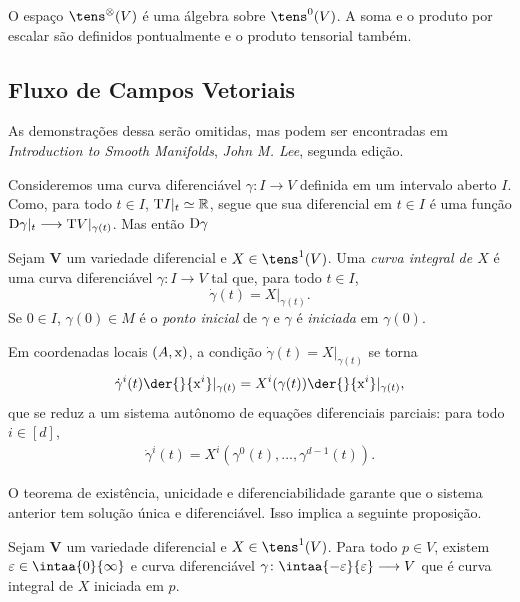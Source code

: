 O espaço $\tens^\otimes (V)$ é uma álgebra sobre $\tens^0(V)$. A soma e o produto por escalar são definidos pontualmente e o produto tensorial também.





\subsection{Fluxo de Campos Vetoriais}

As demonstrações dessa serão omitidas, mas podem ser encontradas em \textit{Introduction to Smooth Manifolds}, \textit{John M. Lee}, segunda edição.

Consideremos uma curva diferenciável $\gamma\colon I \to V$ definida em um intervalo aberto $I$. Como, para todo $t \in I$, $\mathrm{T} I|_t \simeq \mathbb{R}$, segue que sua diferencial em $t \in I$ é uma função $\mathrm{D} \gamma|_t \longrightarrow \mathrm{T} V|_{\gamma(t)}$. Mas então $\mathrm{D} \gamma$

\begin{defi}
Sejam $\bm V$ um variedade diferencial e $X \in \tens^1(V)$. Uma \emph{curva integral de $X$} é uma curva diferenciável $\gamma\colon I \to V$ tal que, para todo $t \in I$,
	\begin{equation*}
	\dot \gamma(t) = X|_{\gamma(t)}.
	\end{equation*}
Se $0 \in I$, $\gamma(0) \in M$ é o \emph{ponto inicial} de $\gamma$ e $\gamma$ é \emph{iniciada} em $\gamma(0)$.
\end{defi}

Em coordenadas locais $(A,\mathrm{x})$, a condição $\dot \gamma(t) = X|_{\gamma(t)}$ se torna
	\begin{equation*}
	\dot \gamma^i(t) \der{}{\x^i}|_{\gamma(t)} = X^i(\gamma(t)) \der{}{\x^i}|_{\gamma(t)},
	\end{equation*}
que se reduz a um sistema autônomo de equações diferenciais parciais: para todo $i \in [d]$,
	\begin{align*}
	\dot \gamma^i(t) = X^i(\gamma^0(t),\ldots,\gamma^{d-1}(t)).
	\end{align*}

O teorema de existência, unicidade e diferenciabilidade garante que o sistema anterior tem solução única e diferenciável. Isso implica a seguinte proposição.

\begin{prop}
Sejam $\bm V$ um variedade diferencial e $X \in \tens^1(V)$. Para todo $p \in V$, existem $\varepsilon \in \intaa{0}{\infty}$ e curva diferenciável $\gamma\colon \intaa{-\varepsilon}{\varepsilon} \to V$ que é curva integral de $X$ iniciada em $p$.
\end{prop}

